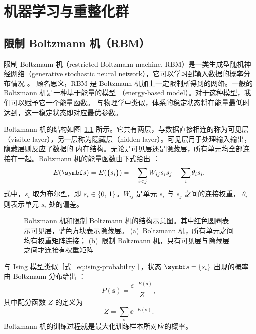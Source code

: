 \chapter{机器学习与重整化群}

\section{限制 Boltzmann 机（RBM）}

限制 Boltzmann 机（restricted Boltzmann machine, RBM）是一类生成型随机神经网络（generative
stochastic neural network），它可以学习到输入数据的概率分布情况 \cite{hinton2006reducing}。
顾名思义，RBM 是 Boltzmann 机加上一定限制所得到的网络。一般的 Boltzmann 机是一种基于能量的模型
（energy-based model）\cite{zhouzhihua,rbmonline}。对于这种模型，我们可以赋予它一个能量函数。
与物理学中类似，体系的稳定状态将在能量最低时达到，这一稳定状态即对应最优参数。

Boltzmann 机的结构如图~\ref{fig:boltzmann-machine} 所示。它共有两层，与数据直接相连的称为可见层
（visible layer），另一层称为隐藏层（hidden layer）。可见层用于处理输入输出，隐藏层则反应了数据的
内在结构。无论是可见层还是隐藏层，所有单元均全部连接在一起。Boltzmann 机的能量函数由下式给出
\cite{zhouzhihua}：
\begin{equation}
  E(\bm{s}) = E(\q{s_i}) = - \sum_{i<j} W_{ij} s_i s_j - \sum_i \theta_i s_i.
\end{equation}
式中，$s_i$ 取为布尔型，即 $s_i\in{\{0,\,1\}}$。$W_{ij}$ 是单元 $s_i$ 与 $s_j$ 之间的连接权重，
$\theta_i$ 则表示单元 $s_i$ 处的偏差。

\begin{figure}[htb]
  \centering
  \begin{subfigure}[b]{0.45\textwidth}
    \centering
    \caption{}
    \label{fig:boltzmann-machine}
  \end{subfigure}
  \begin{subfigure}[b]{0.45\textwidth}
    \centering
    \vspace{0.4cm}
    \caption{}
    \label{fig:rbm}
  \end{subfigure}
  \caption{Boltzmann 机和限制 Boltzmann 机的结构示意图。其中红色圆圈表示可见层，蓝色方块表示隐藏层。
    (a)~Boltzmann 机，所有单元之间均有权重矩阵连接；
    (b)~限制 Boltzmann 机，只有可见层与隐藏层之间才连接有权重矩阵}
\end{figure}

与 Ising 模型类似［式~\eqref{eq:ising-probability}］，状态 $\bm{s}=\q{s_i}$ 出现的概率由 Boltzmann
分布给出 \cite{rbmonline}：
\begin{equation}
  \label{eq:boltzmann-machine-probability}
  P(\bm{s}) = \frac{\ee^{-E(\bm{s})}}{Z},
\end{equation}
其中配分函数 $Z$ 的定义为
\begin{equation}
  Z = \sum_{\bm{s}} \ee^{-E(\bm{s})}.
\end{equation}
Boltzmann 机的训练过程就是最大化训练样本所对应的概率。

